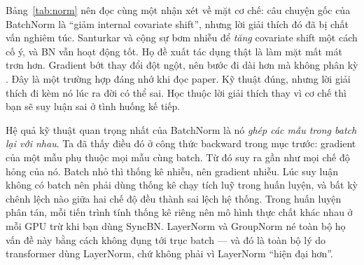 \documentclass[../../../deep_learning.tex]{subfiles}
\begin{document}
Bảng~\ref{tab:norm} nên đọc cùng một nhận xét về mặt cơ chế: câu chuyện gốc của BatchNorm là ``giảm internal covariate shift'', nhưng lời giải thích đó đã bị chất vấn nghiêm túc. Santurkar và cộng sự bơm nhiễu để \emph{tăng} covariate shift một cách cố ý, và BN vẫn hoạt động tốt. Họ đề xuất tác dụng thật là làm mặt mất mát trơn hơn. Gradient bớt thay đổi đột ngột, nên bước đi dài hơn mà không phân kỳ \cite{santurkar2018how}. Đây là một trường hợp đáng nhớ khi đọc paper. Kỹ thuật đúng, nhưng lời giải thích đi kèm nó lúc ra đời có thể sai. Học thuộc lời giải thích thay vì cơ chế thì bạn sẽ suy luận sai ở tình huống kế tiếp.

Hệ quả kỹ thuật quan trọng nhất của BatchNorm là nó \emph{ghép các mẫu trong batch lại với nhau}. Ta đã thấy điều đó ở công thức backward trong mục trước: gradient của một mẫu phụ thuộc mọi mẫu cùng batch. Từ đó suy ra gần như mọi chế độ hỏng của nó. Batch nhỏ thì thống kê nhiễu, nên gradient nhiễu. Lúc suy luận không có batch nên phải dùng thống kê chạy tích luỹ trong huấn luyện, và bất kỳ chênh lệch nào giữa hai chế độ đều thành sai lệch hệ thống. Trong huấn luyện phân tán, mỗi tiến trình tính thống kê riêng nên mô hình thực chất khác nhau ở mỗi GPU trừ khi bạn dùng SyncBN. LayerNorm và GroupNorm né toàn bộ họ vấn đề này bằng cách không đụng tới trục batch --- và đó là toàn bộ lý do transformer dùng LayerNorm, chứ không phải vì LayerNorm ``hiện đại hơn''.
\end{document}
